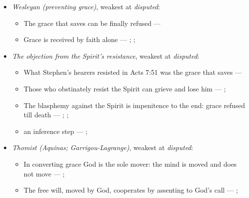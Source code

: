 \documentclass[11pt]{article}
\begin{document}
\begin{itemize}
\begin{itemize}
\item Conversion is God’s work alone: God regenerates, and the will does nothing to it --- \cite[Solid Declaration II.89]{concordia-triglotta-1921}; \cite[Solid Declaration II.90]{concordia-triglotta-1921}
\item Grace is received by faith alone --- \cite[Augsburg Confession IV.1–3]{concordia-triglotta-1921}; \cite[Sermon 1, III.1]{wesley-sermons-1872}; \cite[Trent, Session VI (1547), canon 9]{tanner-decrees-1990}
\end{itemize}
\item \emph{Wesleyan (preventing grace)}, weakest at \emph{disputed}:
\begin{itemize}
\item The grace that saves can be finally refused --- \cite[397]{wesley-works-9-1827}
\item Grace is received by faith alone --- \cite[Augsburg Confession IV.1–3]{concordia-triglotta-1921}; \cite[Sermon 1, III.1]{wesley-sermons-1872}; \cite[Trent, Session VI (1547), canon 9]{tanner-decrees-1990}
\end{itemize}
\item \emph{The objection from the Spirit’s resistance}, weakest at \emph{disputed}:
\begin{itemize}
\item What Stephen’s hearers resisted in Acts 7:51 was the grace that saves --- \cite[Five Arminian Articles (1610), art. 4]{schaff-creeds-christendom-3-1977}
\item Those who obstinately resist the Spirit can grieve and lose him --- \cite[Solid Declaration II.83]{concordia-triglotta-1921}; \cite[Solid Declaration XI.42]{concordia-triglotta-1921}
\item The blasphemy against the Spirit is impenitence to the end: grace refused till death --- \cite[325]{npnf1-06-1888}; \cite[II-II q.14 a.1]{aquinas-summa-1920}; \cite[74]{calvin-harmony-evangelists-2-1845}
\item an inference step --- \cite[325]{npnf1-06-1888}; \cite[On Rebuke and Grace, ch. 43]{npnf1-05-1887}
\end{itemize}
\item \emph{Thomist (Aquinas; Garrigou-Lagrange)}, weakest at \emph{disputed}:
\begin{itemize}
\item In converting grace God is the sole mover: the mind is moved and does not move --- \cite[I-II q.111 a.2]{aquinas-summa-1920}; \cite[ch. IV]{garrigou-lagrange-grace-1952}
\item The free will, moved by God, cooperates by assenting to God’s call --- \cite[Trent, Session VI (1547), canon 4]{tanner-decrees-1990}; \cite[45]{waterworth-trent-1848}

\end{itemize}
\end{itemize}
\end{document}
